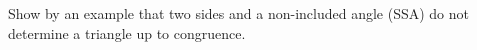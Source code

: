 Show by an example that two sides and a non-included angle (SSA) do not determine a triangle up to congruence.
